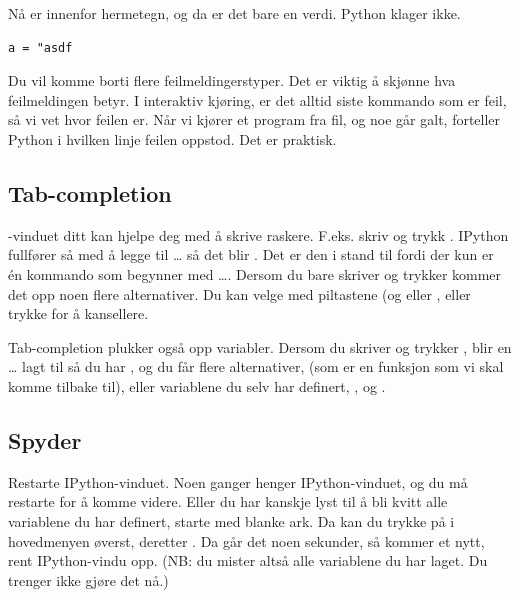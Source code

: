 {Nå er  innenfor hermetegn, og da er det bare en verdi. Python klager ikke.

\begin{lstlisting}
a = "asdf
\end{lstlisting}


Du vil komme borti flere feilmeldingerstyper. Det er viktig å skjønne hva feilmeldingen betyr. I interaktiv kjøring, er det alltid siste kommando som er feil, så vi vet hvor feilen er. Når vi kjører et program fra fil, og noe går galt, forteller Python i hvilken linje
feilen oppstod. Det er praktisk. 

\subsection{Tab-completion}

-vinduet ditt kan hjelpe deg med å skrive raskere. F.eks. skriv  og trykk . IPython fullfører så med å legge til \ldots{} så det blir . Det er den i stand til fordi der kun er én kommando som begynner med \ldots. Dersom du bare skriver  og trykker  kommer det opp noen flere alternativer. Du kan velge med piltastene (og  eller , eller trykke  for å kansellere.

Tab-completion plukker også opp variabler. Dersom du skriver  og trykker , blir en \ldots{} lagt til så du har , og du får flere alternativer,  (som er en funksjon som vi skal komme tilbake til), eller variablene du selv har definert, ,  og .

\subsection{Spyder}
Restarte IPython-vinduet. Noen ganger henger IPython-vinduet, og du må restarte for å komme videre. Eller du har kanskje lyst til å bli kvitt alle variablene du har definert, starte med blanke ark.  Da kan du trykke på  i hovedmenyen øverst, deretter . Da går det noen sekunder, så kommer et nytt, rent IPython-vindu opp. (NB: du mister altså alle variablene du har laget. Du trenger ikke gjøre det nå.)

}
